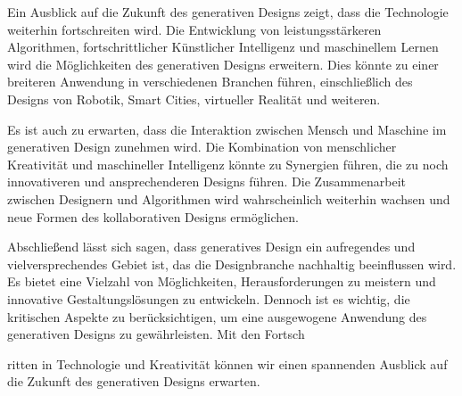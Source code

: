 Ein Ausblick auf die Zukunft des generativen Designs zeigt, dass die Technologie weiterhin fortschreiten wird. Die Entwicklung von leistungsstärkeren Algorithmen, fortschrittlicher Künstlicher Intelligenz und maschinellem Lernen wird die Möglichkeiten des generativen Designs erweitern. Dies könnte zu einer breiteren Anwendung in verschiedenen Branchen führen, einschließlich des Designs von Robotik, Smart Cities, virtueller Realität und weiteren.

Es ist auch zu erwarten, dass die Interaktion zwischen Mensch und Maschine im generativen Design zunehmen wird. Die Kombination von menschlicher Kreativität und maschineller Intelligenz könnte zu Synergien führen, die zu noch innovativeren und ansprechenderen Designs führen. Die Zusammenarbeit zwischen Designern und Algorithmen wird wahrscheinlich weiterhin wachsen und neue Formen des kollaborativen Designs ermöglichen.

Abschließend lässt sich sagen, dass generatives Design ein aufregendes und vielversprechendes Gebiet ist, das die Designbranche nachhaltig beeinflussen wird. Es bietet eine Vielzahl von Möglichkeiten, Herausforderungen zu meistern und innovative Gestaltungslösungen zu entwickeln. Dennoch ist es wichtig, die kritischen Aspekte zu berücksichtigen, um eine ausgewogene Anwendung des generativen Designs zu gewährleisten. Mit den Fortsch

ritten in Technologie und Kreativität können wir einen spannenden Ausblick auf die Zukunft des generativen Designs erwarten.